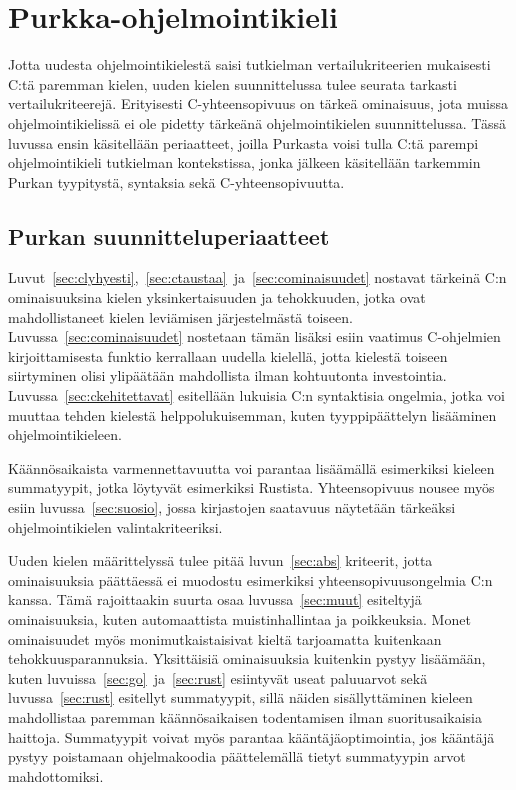 \section{Purkka-ohjelmointikieli}
\label{sec:purkka}

Jotta uudesta ohjelmointikielestä saisi tutkielman vertailukriteerien
mukaisesti C:tä paremman kielen, uuden kielen suunnittelussa tulee seurata
tarkasti vertailukriteerejä. Erityisesti C-yhteensopivuus on tärkeä ominaisuus,
jota muissa ohjelmointikielissä ei ole pidetty tärkeänä ohjelmointikielen
suunnittelussa. Tässä luvussa ensin käsitellään periaatteet, joilla Purkasta
voisi tulla C:tä parempi ohjelmointikieli tutkielman kontekstissa, jonka
jälkeen käsitellään tarkemmin Purkan tyypitystä, syntaksia sekä
C-yhteensopivuutta.

\subsection{Purkan suunnitteluperiaatteet}

Luvut~\ref{sec:clyhyesti},~\ref{sec:ctaustaa}~ja~\ref{sec:cominaisuudet}
nostavat tärkeinä C:n ominaisuuksina kielen yksinkertaisuuden ja tehokkuuden,
jotka ovat mahdollistaneet kielen leviämisen järjestelmästä toiseen.
Luvussa~\ref{sec:cominaisuudet} nostetaan tämän lisäksi esiin vaatimus
C-ohjelmien kirjoittamisesta funktio kerrallaan uudella kielellä, jotta
kielestä toiseen siirtyminen olisi ylipäätään mahdollista ilman kohtuutonta
investointia. Luvussa~\ref{sec:ckehitettavat} esitellään lukuisia C:n
syntaktisia ongelmia, jotka voi muuttaa tehden kielestä helppolukuisemman,
kuten tyyppipäättelyn lisääminen ohjelmointikieleen.

Käännösaikaista varmennettavuutta voi parantaa lisäämällä esimerkiksi
kieleen summatyypit, jotka löytyvät esimerkiksi Rustista. Yhteensopivuus nousee
myös esiin luvussa~\ref{sec:suosio}, jossa kirjastojen saatavuus näytetään
tärkeäksi ohjelmointikielen valintakriteeriksi.

Uuden kielen määrittelyssä tulee pitää luvun~\ref{sec:abs} kriteerit, jotta
ominaisuuksia päättäessä ei muodostu esimerkiksi yhteensopivuusongelmia C:n
kanssa. Tämä rajoittaakin suurta osaa luvussa~\ref{sec:muut} esiteltyjä
ominaisuuksia, kuten automaattista muistinhallintaa ja poikkeuksia. Monet
ominaisuudet myös monimutkaistaisivat kieltä tarjoamatta kuitenkaan
tehokkuusparannuksia. Yksittäisiä ominaisuuksia kuitenkin pystyy lisäämään,
kuten luvuissa~\ref{sec:go}~ja~\ref{sec:rust} esiintyvät useat paluuarvot sekä
luvussa~\ref{sec:rust} esitellyt summatyypit, sillä näiden sisällyttäminen
kieleen mahdollistaa paremman käännösaikaisen todentamisen ilman
suoritusaikaisia haittoja. Summatyypit voivat myös parantaa
kääntäjäoptimointia, jos kääntäjä pystyy poistamaan ohjelmakoodia päättelemällä
tietyt summatyypin arvot mahdottomiksi.

